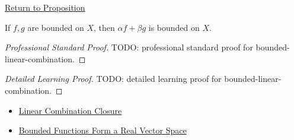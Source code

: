 \newpage
{}
\label{prf:bounded-linear-combination}

\begin{remark*}[Return]
\hyperref[prop:bounded-linear-combination]{Return to Proposition}
\end{remark*}

\begin{proposition*}
If \(f,g\) are bounded on \(X\), then \(\alpha f+\beta g\) is bounded on \(X\).
\end{proposition*}

\begin{proof}[Professional Standard Proof]
\LRAProofBodyStart
TODO: professional standard proof for bounded-linear-combination.
\end{proof}

\begin{proof}[Detailed Learning Proof]
\LRAProofBodyStart
TODO: detailed learning proof for bounded-linear-combination.
\end{proof}

\begin{remark*}
\end{remark*}

\begin{dependencies}
\begin{itemize}
  \item \hyperref[prop:linear-combination-closure]{Linear Combination Closure}
  \item \hyperref[thm:bounded-functions-form-real-vector-space]{Bounded Functions Form a Real Vector Space}
\end{itemize}
\end{dependencies}

\clearpage
